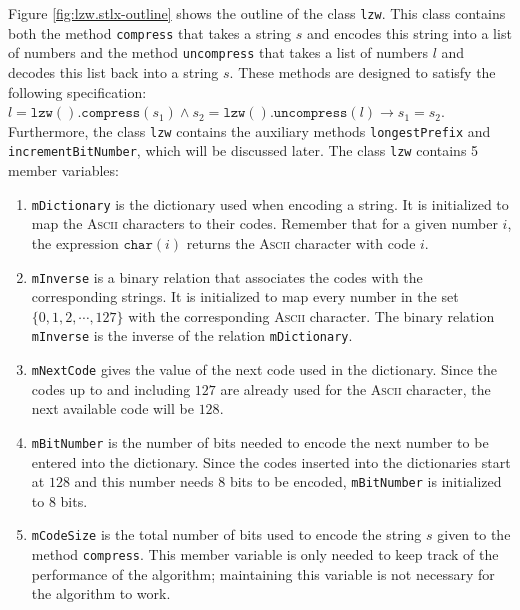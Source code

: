 Figure \ref{fig:lzw.stlx-outline} shows the outline of the class \texttt{lzw}.  This class contains both the
method \texttt{compress} that takes a string $s$ and encodes this string into a list of numbers
and the method \texttt{uncompress} that takes a list of numbers $l$ and decodes this list back into
a string $s$.  These methods are designed to satisfy the following specification:
\\[0.2cm]
\hspace*{1.3cm}
$l = \mathtt{lzw().compress}(s_1) \wedge s_2 = \mathtt{lzw().uncompress}(l) \rightarrow s_1 = s_2$.
\\[0.2cm]
Furthermore, the class \texttt{lzw} contains the auxiliary methods \texttt{longestPrefix} and
\texttt{incrementBitNumber}, which will be discussed later.  The class \texttt{lzw} contains 5
member variables:
\begin{enumerate}
\item \texttt{mDictionary} is the dictionary used when encoding a string.  It is initialized to map
      the \textsc{Ascii} characters to their codes.  Remember that for a given number $i$, the
      expression $\mathtt{char}(i)$ returns the \textsc{Ascii} character with code $i$.
\item \texttt{mInverse} is a binary relation that associates the codes with the corresponding
      strings.  It is initialized to map every number in the set $\{ 0, 1, 2, \cdots, 127 \}$
      with the corresponding \textsc{Ascii} character.  The binary relation \texttt{mInverse} is the
      inverse of the relation \texttt{mDictionary}.
\item \texttt{mNextCode} gives the value of the next code used in the dictionary.  Since the codes
      up to and including $127$ are already used for the \textsc{Ascii} character, the next
      available code will be $128$.
\item \texttt{mBitNumber} is the number of bits needed to encode the next number to be entered into
      the dictionary.  Since the codes inserted into the dictionaries start at $128$ and this number
      needs $8$ bits to be encoded, \texttt{mBitNumber} is initialized to $8$ bits.
\item \texttt{mCodeSize} is the total number of bits used to encode the string $s$ given to the
      method \texttt{compress}.  This member variable is only needed to keep track of the
      performance of the algorithm; maintaining this variable is not necessary for the algorithm to
      work. 
\end{enumerate}

